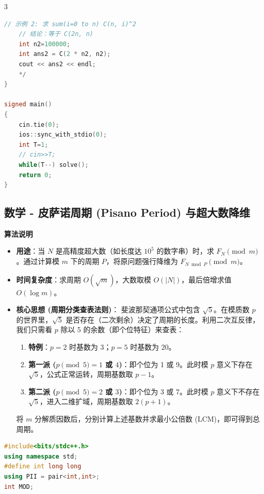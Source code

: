 \documentclass[10pt,landscape,a4paper]{article}
\begin{document}
\begin{multicols*}{3}
\begin{lstlisting}[language=C++]
    // 示例 2: 求 sum(i=0 to n) C(n, i)^2
    // 结论：等于 C(2n, n)
    int n2=100000;
    int ans2 = C(2 * n2, n2);
    cout << ans2 << endl;
    */
}

signed main()
{
    cin.tie(0);
    ios::sync_with_stdio(0);
    int T=1;
    // cin>>T;
    while(T--) solve();
    return 0;
}
\end{lstlisting}
\subsection*{数学 - 皮萨诺周期 (Pisano Period) 与超大数降维}
\par\addvspace{0.7ex}\noindent\textbf{算法说明}\par\nobreak
\begin{itemize}
\item \textbf{用途}：当 $N$ 是高精度超大数（如长度达 $10^5$ 的数字串）时，求 $F_N \pmod m$。通过计算模 $m$ 下的周期 $P$，将原问题强行降维为 $F_{N \bmod P} \pmod m$。
\item \textbf{时间复杂度}：求周期 $O(\sqrt{m})$，大数取模 $O(|N|)$，最后倍增求值 $O(\log m)$。
\item \textbf{核心思想 (周期分类查表法则)}：
斐波那契通项公式中包含 $\sqrt{5}$。在模质数 $p$ 的世界里，$\sqrt{5}$ 是否存在（二次剩余）决定了周期的长度。利用二次互反律，我们只需看 $p$ 除以 5 的余数（即个位特征）来查表：\par
\begin{enumerate}[start=1]
\item \textbf{特例}：$p=2$ 时基数为 $3$；$p=5$ 时基数为 $20$。
\item \textbf{第一派 ($p \pmod 5 = 1$ 或 $4$)}：即个位为 1 或 9。此时模 $p$ 意义下存在 $\sqrt{5}$，公式正常运转，周期基数取 \textbf{$p-1$}。
\item \textbf{第二派 ($p \pmod 5 = 2$ 或 $3$)}：即个位为 3 或 7。此时模 $p$ 意义下不存在 $\sqrt{5}$，进入二维扩域，周期基数取 \textbf{$2(p+1)$}。
\end{enumerate}
将 $m$ 分解质因数后，分别计算上述基数并求最小公倍数 (LCM)，即可得到总周期。\par
\end{itemize}
\par{}\par
\begin{lstlisting}[language=C++]
#include<bits/stdc++.h>
using namespace std;
#define int long long
using PII = pair<int,int>;
int MOD;


\end{lstlisting}
\end{multicols*}
\end{document}
